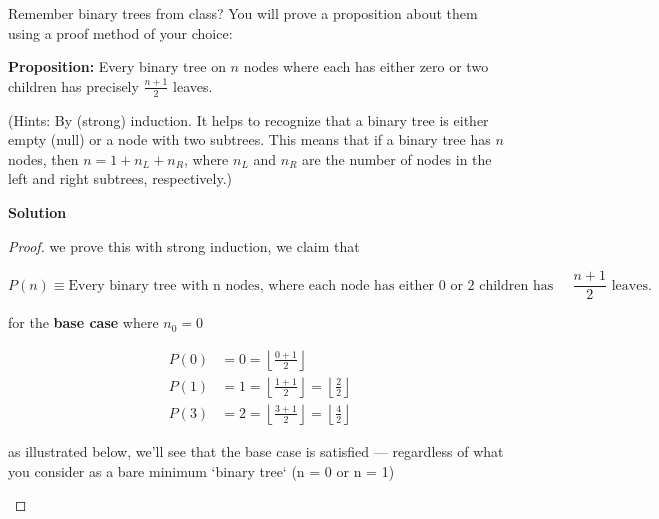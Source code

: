 \documentclass{article}
\newcommand{\solution}{\textbf{\large Solution}}
\theoremstyle{remark}
\begin{document}
Remember binary trees from class? You will prove a proposition about them using a proof method of your choice:

\textbf{Proposition:} Every binary tree on $n$ nodes where each has either zero or two children has precisely $\frac{n+1}{2}$ leaves.

(Hints: By (strong) induction. It helps to recognize that a binary tree is either empty (null) or a node with two subtrees. This means that if a binary tree has $n$ nodes, then $n = 1 + n_L + n_R$, where $n_L$ and $n_R$ are the number of nodes in the left and right subtrees, respectively.)

\medskip
\solution

\begin{proof}

we prove this with strong induction, we claim that

\[P(n) \equiv \text{Every binary tree with n nodes, where each node has either 0 or 2 children has exactly } \frac{n+1}{2} \text{ leaves.}\]

for the \textbf{base case} where $n_0 = 0$ 

\[
\begin{aligned}
P(0) &= 0 = \left\lfloor{\frac{0+1}{2}}\right\rfloor \\
P(1) &= 1 = \left\lfloor{\frac{1+1}{2}}\right\rfloor = \left\lfloor{\frac{2}{2}}\right\rfloor \\
P(3) &= 2 = \left\lfloor{\frac{3+1}{2}}\right\rfloor = \left\lfloor{\frac{4}{2}}\right\rfloor
\end{aligned}
\]

as illustrated below, we'll see that the base case is satisfied --- regardless of what you consider as a bare minimum `binary tree` (n = 0 or n = 1)
 
\begin{center}
\end{center}
\end{proof}
\end{document}
